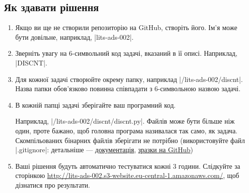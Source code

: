 \documentclass[12pt,a4paper]{article}
\begin{document}
\subsection*{Як здавати рішення}

\begin{enumerate}
    \item Якщо ви ще не створили репозиторію на GitHub, створіть його. Ім’я може бути довільне, наприклад, |lits-ads-002|.
    \item Зверніть увагу на 6-символьний код задачі, вказаний в її описі. Наприклад, |DISCNT|.
    \item Для кожної задачі створюйте окрему папку, наприклад |/lits-ads-002/discnt|. Назва папки обов’язково повинна співпадати з 6-символьною назвою задачі.
    \item В кожній папці задачі зберігайте ваш програмний код.

    Наприклад, |/lits-ads-002/discnt/discnt.py|. Файлів може бути більше ніж один, проте бажано, щоб головна програма називалася так само, як задача. Скомпільованих бінарних файлів зберігати не потрібно (використовуйте файл |.gitignore|: детальніше --- \href{http://git-scm.com/docs/gitignore}{документація}, \href{https://github.com/github/gitignore}{зразки на GitHub})

    \item Ваші рішення будуть автоматично тестуватися кожні 3 години. Слідкуйте за сторінкою \href{http://lits-ads-002.s3-website.eu-central-1.amazonaws.com/}{http://lits-ads-002.s3-website.eu-central-1.amazonaws.com/}, щоб дізнатися про результати.
\end{enumerate}
\end{document}
